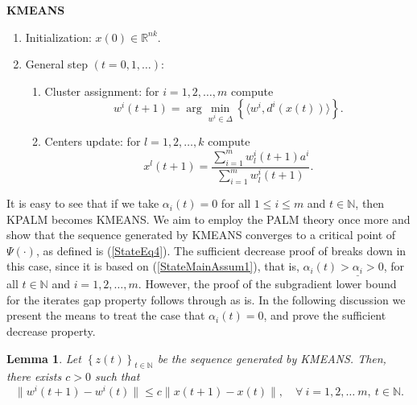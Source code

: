 \documentclass[11pt]{article}
\numberwithin{equation}{section}
\newtheorem{lemma}{Lemma}[proposition]
\begin{document}
\begin{framed}
\noindent \textbf{KMEANS}
\begin{enumerate}[(1)]
	\item Initialization: $x(0) \in \mathbb{R}^{nk}$.
	\item General step $\left( t=0,1, \ldots \right)$:
	\begin{enumerate}[(2.1)]
		\item Cluster assignment: for $i=1, 2, \ldots ,m$ compute
		\begin{equation}
			w^i(t+1) = \arg\!\min\limits_{w^i \in \Delta} \left\lbrace \langle w^i , d^i(x(t)) \rangle\right\rbrace . \label{StateEq12}
		\end{equation}
		\item Centers update: for $l=1, 2, \ldots ,k$ compute
		\begin{equation}
			x^l(t+1) = \frac{\sum_{i=1}^{m} w^i_l(t+1) a^i}{\sum_{i=1}^{m} w^i_l(t+1)} . \label{StateEq13}
		\end{equation}
	\end{enumerate}
\end{enumerate}
\end{framed}

It is easy to see that if we take $\alpha_i(t) = 0$ for all $1 \leq i \leq m$ and $t \in \mathbb{N}$, then KPALM becomes KMEANS. We aim to employ the PALM theory once more and show that the sequence generated by KMEANS converges to a critical point of $\Psi(\cdot)$, as defined is (\ref{StateEq4}). The sufficient decrease proof of  breaks down in this case, since it is based on (\ref{StateMainAssum1}), that is, $\alpha_i(t) > \underline{\alpha_i} > 0$, for all $t \in \mathbb{N}$ and $i=1,2, \ldots, m$. However, the proof of the subgradient lower bound for the iterates gap property follows through as is. In the following discussion we present the means to treat the case that $\alpha_i(t) = 0$, and prove the sufficient decrease property.

\begin{lemma} \label{StateLemma_x_bounds_w}
Let $\left\lbrace z(t) \right\rbrace_{t \in \mathbb{N}}$ be the sequence generated by KMEANS. Then, there exists $c > 0$ such that
\begin{equation*}
	\|w^i(t+1)-w^i(t)\| \leq c \|x(t+1)-x(t)\| , \quad \forall \: i=1,2, \ldots\ m, \: t \in \mathbb{N} .
\end{equation*}
\end{lemma}
\end{document}
